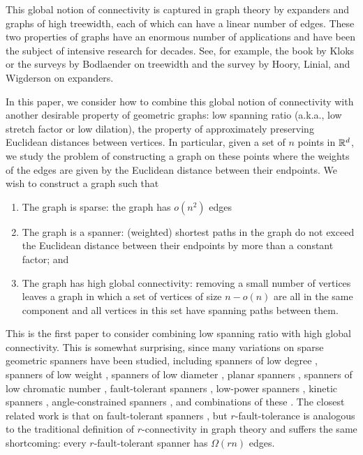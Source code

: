 \documentclass{patmorin}
\begin{document}
This global notion of connectivity is captured in graph theory by
expanders and graphs of high treewidth, each of which can have a linear
number of edges.  These two properties of graphs have an enormous number
of applications and have been the subject of intensive research for
decades.  See, for example, the book by Kloks \cite{k94} or the surveys
by Bodlaender \cite{b98,b07} on treewidth and the survey by Hoory, Linial,
and Wigderson \cite{hlw06} on expanders.

In this paper, we consider how to combine this global notion of
connectivity with another desirable property of geometric graphs:
low spanning ratio (a.k.a., low stretch factor or low dilation),  the
property of approximately preserving Euclidean distances between vertices.
In particular, given a set of $n$ points in $\mathbb{R}^d$, we study the problem
of constructing a graph on these points where the weights of the edges
are given by the Euclidean distance between their endpoints. We wish
to construct a graph such that
\begin{enumerate}
  \item The graph is sparse: the graph has $o(n^2)$ edges
  \item The graph is a spanner: (weighted) shortest paths in the graph
    do not exceed the Euclidean distance between their endpoints by more
    than a constant factor; and
  \item The graph has high global connectivity: removing a small number
    of vertices leaves a graph in which a set of vertices of size $n-o(n)$
    are all in the same component and all vertices in this set have
    spanning paths between them.
\end{enumerate}

This is the first paper to consider combining low spanning ratio
with high global connectivity.  This is somewhat surprising, since
many variations on sparse geometric spanners have been studied,
including spanners of low degree \cite{abcghsv08,cc10,s06}, spanners
of low weight \cite{bcfms10,dn97,gln02}, spanners of low diameter
\cite{ams94,ams99}, planar spanners \cite{accdsz96,c89,dj89,kg89},
spanners of low chromatic number \cite{bccmsz09}, fault-tolerant
spanners \cite{abfg09,cz04,lns02,l99}, low-power spanners
\cite{aack11,ss10,wl06}, kinetic spanners \cite{ab11,abg10},
angle-constrained spanners \cite{cs10}, and combinations of these
\cite{admss95,as97,bfrv12,bgs05,bsx09,cc10b}.  The closest related
work is that on fault-tolerant spanners \cite{abfg09,cz04,lns02,l99},
but $r$-fault-tolerance is analogous to the traditional definition
of $r$-connectivity in graph theory and suffers the same shortcoming:
every $r$-fault-tolerant spanner has $\Omega(rn)$ edges.
\end{document}
